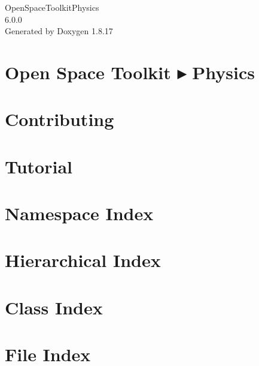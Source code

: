 \let\mypdfximage\pdfximage\def\pdfximage{\immediate\mypdfximage}\documentclass[twoside]{book}
\newcommand{\+}{\discretionary{\mbox{\scriptsize$\hookleftarrow$}}{}{}}
\newcommand{\clearemptydoublepage}{%
  \newpage{\pagestyle{empty}\cleardoublepage}%
}
\begin{document}
\hypersetup{pageanchor=false,
             bookmarksnumbered=true,
             pdfencoding=unicode
            }
\begin{titlepage}
\vspace*{7cm}
\begin{center}%
{\Large Open\+Space\+Toolkit\+Physics \\[1ex]\large 6.\+0.\+0 }\\
\vspace*{1cm}
{\large Generated by Doxygen 1.8.17}\\
\end{center}
\end{titlepage}
\clearemptydoublepage
{}
\tableofcontents
\clearemptydoublepage
{}
\hypersetup{pageanchor=true}

\chapter{Open Space Toolkit ▸ Physics}
\label{index}\hypertarget{index}{}
\chapter{Contributing}
\label{md__c_o_n_t_r_i_b_u_t_i_n_g}

\chapter{Tutorial}
\label{md_docs__tutorial}

\chapter{Namespace Index}

\chapter{Hierarchical Index}

\chapter{Class Index}

\chapter{File Index}

\end{document}
